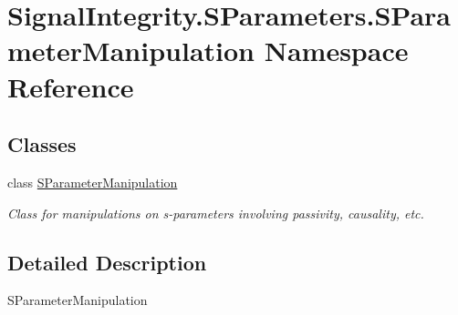 \hypertarget{namespaceSignalIntegrity_1_1SParameters_1_1SParameterManipulation}{}\section{Signal\+Integrity.\+S\+Parameters.\+S\+Parameter\+Manipulation Namespace Reference}
\label{namespaceSignalIntegrity_1_1SParameters_1_1SParameterManipulation}
\subsection*{Classes}
\begin{DoxyCompactItemize}
\item 
class \hyperlink{classSignalIntegrity_1_1SParameters_1_1SParameterManipulation_1_1SParameterManipulation}{S\+Parameter\+Manipulation}
\begin{DoxyCompactList}\small\item\em Class for manipulations on s-\/parameters involving passivity, causality, etc. \end{DoxyCompactList}\end{DoxyCompactItemize}


\subsection{Detailed Description}
\begin{DoxyVerb}SParameterManipulation\end{DoxyVerb}
 